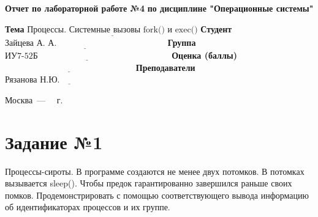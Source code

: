 \documentclass[12pt]{report}
\begin{document}
\begin{titlepage}
	
	\begin{center}
		\noindent\begin{minipage}{1.3\textwidth}\centering
			\Large\textbf{  Отчет по лабораторной работе №4}\newline
			\textbf{по дисциплине "Операционные системы"}\newline\newline
		\end{minipage}
	\end{center}
	
	\noindent\textbf{Тема} $\underline{\text{Процессы. Системные вызовы fork() и exec()}}$\newline\newline
	\noindent\textbf{Студент} $\underline{\text{Зайцева А. А.~~~~~~~~~~~~~~~~~~~~~~~~~~~~~~~~~~~~~~}}$\newline\newline
	\noindent\textbf{Группа} $\underline{\text{ИУ7-52Б~~~~~~~~~~~~~~~~~~~~~~~~~~~~~~~~~~~~~~~~~~~~~~}}$\newline\newline
	\noindent\textbf{Оценка (баллы)} $\underline{\text{~~~~~~~~~~~~~~~~~~~~~~~~~~~~~~~~~~~~~~~~~~~~~}}$\newline\newline
	\noindent\textbf{Преподаватели} $\underline{\text{Рязанова Н.Ю.~~~~~~~~~~~~~~~~~~~~~~~~~~}}$\newline\newline\newline
	
	\begin{center}
		\vfill
		Москва~---~\the\year
		~г.
	\end{center}
\end{titlepage}

\newpage

\section*{Задание №1}


Процессы-сироты. В программе создаются не менее двух потомков. В потомках вызывается sleep(). Чтобы предок гарантированно завершился раньше своих помков. Продемонстрировать с помощью соответствующего вывода информацию об идентификаторах процессов и их группе.
\end{document}
